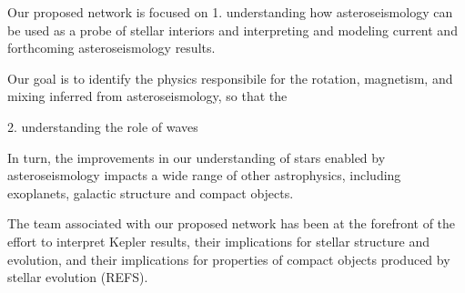 Our proposed network is focused on 1.  understanding how asteroseismology can be used as a probe of stellar interiors and interpreting and modeling current and forthcoming asteroseismology results.   

Our goal is to identify the physics responsibile for the rotation, magnetism, and mixing inferred from asteroseismology, so that the 

2.  understanding the role of waves 

In turn, the improvements in our understanding of stars enabled by asteroseismology impacts a wide range of other astrophysics, including exoplanets, galactic structure and compact objects.   


The team associated with our proposed network has been at the forefront of the effort to interpret Kepler results, their implications for stellar structure and evolution, and their implications for properties of compact objects produced by stellar evolution (REFS).   

